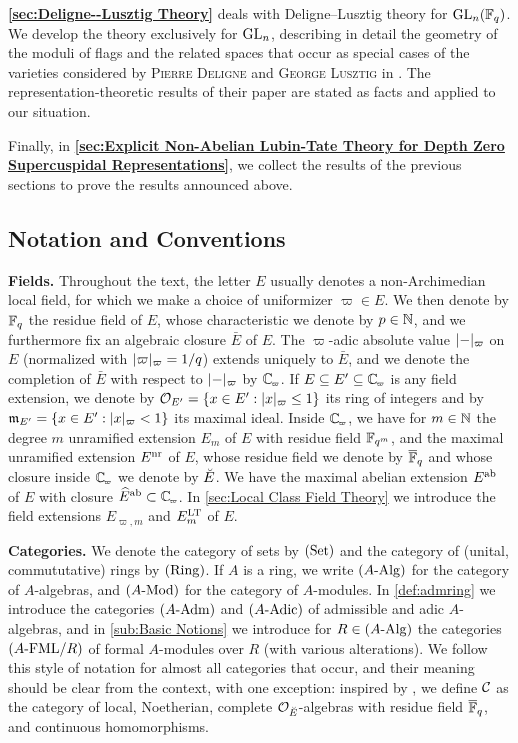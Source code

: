 \documentclass[../main.tex]{subfiles}
\begin{document}
\textbf{\cref{sec:Deligne--Lusztig Theory}} deals with Deligne--Lusztig theory
for $\operatorname{GL}_n(\mathbb{F}_q)$. 
We develop the theory exclusively for $\operatorname{GL}_n$, describing in detail the 
geometry of the moduli of flags and the related spaces that occur as 
special cases of the varieties considered by 
\textsc{Pierre Deligne} and \textsc{George Lusztig} in
\cite{delignelusztig1976}. The representation-theoretic results of their paper
are stated as facts and applied to our situation.

Finally, in \textbf{\cref{sec:Explicit Non-Abelian Lubin-Tate Theory for Depth
Zero Supercuspidal Representations}}, we collect the results of the 
previous sections to prove the results announced above. 

\subsection*{Notation and Conventions} %

\textbf{Fields.} Throughout the text, the letter $E$ usually denotes
a non-Archimedian local field, for which we make a choice of uniformizer
$\varpi \in E$. We then denote by $\mathbb{F}_q$ the residue
field of $E$, whose characteristic we denote by $p \in \mathbb{N}$, and we furthermore fix
an algebraic closure $\bar E$ of $E$. The $\varpi$-adic absolute value $\lvert - \rvert_\varpi$ on $E$ (normalized with $\lvert \varpi \rvert_\varpi = 1/q$) extends uniquely
to $\bar E$, and we denote the completion of $\bar E$ with respect to $\lvert - \rvert_\varpi$ by $\Cp$. If $E \subseteq E' \subseteq \Cp$ is any
field extension, we denote by $\mathcal{O}_{E'} = \{x \in E' : \lvert x \rvert_\varpi \leq 1\}$
its ring of integers and by $\mathfrak{m}_{E'} = \{x \in E' : \lvert x \rvert_{\varpi} < 1\}$ its
maximal ideal. Inside $\Cp$, we have for $m\in \mathbb{N}$ the degree $m$ unramified
extension $E_m$ of $E$ with residue field $\mathbb{F}_{q^m}$, and the maximal unramified extension
$E^{\mathrm{nr}}$ of $E$, whose residue field we denote by ${\overline {\mathbb{F}}_q}$ and whose closure
inside $\Cp$ we denote by ${\breve {E}}$. We have the maximal abelian extension $E^{\mathrm{ab}}$ of 
$E$ with closure $\hat E^\ab \subset \Cp$. In \cref{sec:Local Class Field Theory} we 
introduce the field extensions $E_{\varpi, m}$ and $E^{\mathrm{LT}}_m$ of $E$.

\textbf{Categories.} 
We denote the category of sets by ${(\mathrm{Set})}$ and the category of (unital,
commututative) rings by ${(\mathrm{Ring})}$. If $A$ is a ring, we write ${({A}\textnormal-\allowbreak\mathrm{Alg})}$ for the
category of $A$-algebras, and ${({A}\textnormal-\allowbreak\mathrm{Mod})}$ for the category of $A$-modules.
In \cref{def:admring} we introduce the categories ${({A}\textnormal-\allowbreak\mathrm{Adm})}$ and ${({A}\textnormal-\allowbreak\mathrm{Adic})}$ of 
admissible and adic $A$-algebras, and in \cref{sub:Basic Notions} we introduce 
for $R \in {({A}\textnormal-\allowbreak\mathrm{Alg})}$ the categories ${({A}\textnormal-\allowbreak\mathrm{FML}/{R})}$ of formal $A$-modules over $R$
(with various alterations). We follow this style of notation for almost all categories
that occur, and their meaning should be clear from the context, with one exception:
inspired by \cite{drinfel1974elliptic}, we define $\mathcal{C}$ as the category of
local, Noetherian, complete $\mathcal{O}_{\breve {E}}$-algebras with residue field ${\overline {\mathbb{F}}_q}$,
and continuous homomorphisms.
\end{document}
